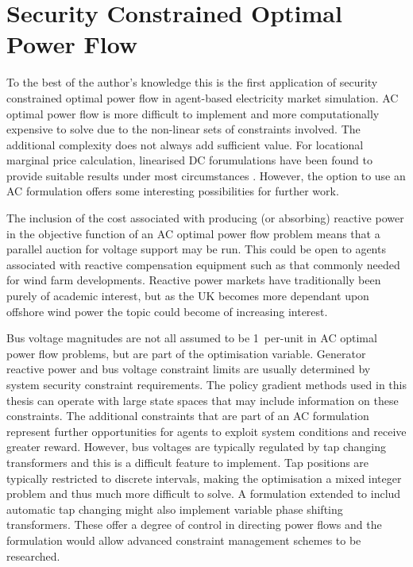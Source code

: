 \section{Security Constrained Optimal Power Flow}
To the best of the author's knowledge this is the first application of security
constrained optimal power flow in agent-based electricity market simulation.
AC optimal power flow is more difficult to implement and more computationally
expensive to solve due to the non-linear sets of constraints involved.  The
additional complexity does not always add sufficient value.  For locational
marginal price calculation, linearised DC forumulations have been found to
provide suitable results under most circumstances \cite{overbye:acdc}.
However, the option to use an AC formulation offers some interesting
possibilities for further work.

The inclusion of the cost associated with producing (or absorbing) reactive
power in the objective function of an AC optimal power flow problem means that
a parallel auction for voltage support may be run.  This could be open to
agents associated with reactive compensation equipment such as that commonly
needed for wind farm developments.  Reactive power markets have traditionally
been purely of academic interest, but as the UK becomes more dependant upon
offshore wind power the topic could become of increasing interest.

Bus voltage magnitudes are not all assumed to be 1~per-unit in AC optimal power
flow problems, but are part of the optimisation variable.  Generator reactive
power and bus voltage constraint limits are usually determined by system
security constraint requirements.  The policy gradient methods used in this
thesis can operate with large state spaces that may include information on
these constraints.  The additional constraints that are part of an AC
formulation represent further opportunities for agents to exploit system
conditions and receive greater reward.  However, bus voltages are typically
regulated by tap changing transformers and this is a difficult feature to
implement.  Tap positions are typically restricted to discrete intervals,
making the optimisation a mixed integer problem and thus much more difficult
to solve.  A formulation extended to includ automatic tap changing might also
implement variable phase shifting transformers.  These offer a degree of
control in directing power flows and the formulation would allow advanced
constraint management schemes to be researched.

